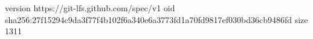 version https://git-lfs.github.com/spec/v1
oid sha256:27f15294c9da3f77f4b102f6a340e6a3773fd1a70fd9817ef030bd36cb9486fd
size 1311
